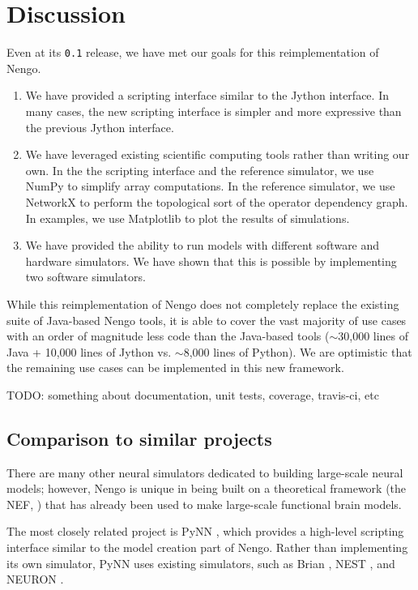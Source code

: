 \documentclass{frontiersSCNS}
\begin{document}
\section{Discussion}

Even at its \texttt{0.1} release,
we have met our goals
for this reimplementation of Nengo.
\begin{enumerate}
  \item We have provided a scripting interface
    similar to the Jython interface.
    In many cases, the new scripting interface
    is simpler and more expressive than
    the previous Jython interface.
  \item We have leveraged existing scientific computing tools
    rather than writing our own.
    In the the scripting interface and the reference simulator,
    we use NumPy to simplify array computations.
    In the reference simulator, we use
    NetworkX to perform the topological sort
    of the operator dependency graph.
    In examples, we use Matplotlib
    to plot the results of simulations.
  \item We have provided the ability to run models with
    different software and hardware simulators.
    We have shown that this is possible by
    implementing two software simulators.
\end{enumerate}

While this reimplementation of Nengo
does not completely replace
the existing suite of Java-based Nengo tools,
it is able to cover the vast majority of use cases
with an order of magnitude less
code than the Java-based tools
($\sim$30,000 lines of Java + 10,000 lines of Jython
vs. $\sim$8,000 lines of Python).
We are optimistic that the remaining use cases
can be implemented in this new framework.

TODO: something about documentation, unit tests,
coverage, travis-ci, etc

\subsection{Comparison to similar projects}

There are many other neural simulators
dedicated to building large-scale neural models;
however, Nengo is unique in being built
on a theoretical framework (the NEF, \cite{TODO})
that has already been used to make
large-scale functional brain models.

The most closely related project is PyNN
\cite{TODO},
which provides a high-level scripting
interface similar to the
model creation part of Nengo.
Rather than implementing its
own simulator, PyNN uses existing
simulators, such as Brian \cite{TODO},
NEST \cite{TODO}, and NEURON \cite{TODO}.
\end{document}
